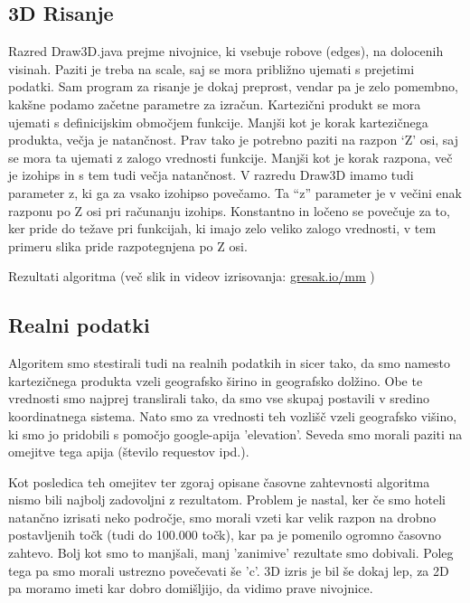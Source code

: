 \documentclass[a4paper,11pt]{article}
\begin{document}
\subsection{3D Risanje}

Razred Draw3D.java prejme nivojnice, ki vsebuje robove (edges), na dolocenih visinah. Paziti je treba na scale, saj se mora približno ujemati s prejetimi podatki. Sam program za risanje je dokaj preprost, vendar pa je zelo pomembno, kakšne podamo začetne parametre za izračun. Kartezični produkt se mora ujemati s definicijskim območjem funkcije. Manjši kot je korak kartezičnega produkta, večja je natančnost. Prav tako je potrebno paziti na razpon `Z' osi, saj se mora ta ujemati z zalogo vrednosti funkcije. Manjši kot je korak razpona, več je izohips in s tem tudi večja natančnost. V razredu Draw3D imamo tudi parameter z, ki ga za vsako izohipso povečamo. Ta ``z'' parameter je v večini enak razponu po Z osi pri računanju izohips. Konstantno in ločeno se povečuje za to, ker pride do težave pri funkcijah, ki imajo zelo veliko zalogo vrednosti, v tem primeru slika pride razpotegnjena po Z osi.
\par
Rezultati algoritma (več slik in videov izrisovanja: \href{https://gresak.io/mm}{\underline{gresak.io/mm}} )


\subsection{Realni podatki}

Algoritem smo stestirali tudi na realnih podatkih in sicer tako, da smo namesto kartezičnega produkta vzeli geografsko širino in geografsko dolžino. Obe te vrednosti smo najprej translirali tako, da smo vse skupaj postavili v sredino koordinatnega sistema. Nato smo za vrednosti teh vozlišč vzeli geografsko višino, ki smo jo pridobili s pomočjo google-apija 'elevation'. Seveda smo morali paziti na omejitve tega apija (število requestov ipd.).

Kot posledica teh omejitev ter zgoraj opisane časovne zahtevnosti algoritma nismo bili najbolj zadovoljni z rezultatom. Problem je nastal, ker če smo hoteli natančno izrisati neko področje, smo morali vzeti kar velik razpon na drobno postavljenih točk (tudi do 100.000 točk), kar pa je pomenilo ogromno časovno zahtevo. Bolj kot smo to manjšali, manj 'zanimive' rezultate smo dobivali. Poleg tega pa smo morali ustrezno povečevati še 'c'. 3D izris je bil še dokaj lep, za 2D pa moramo imeti kar dobro domišljijo, da vidimo prave nivojnice.
\end{document}
